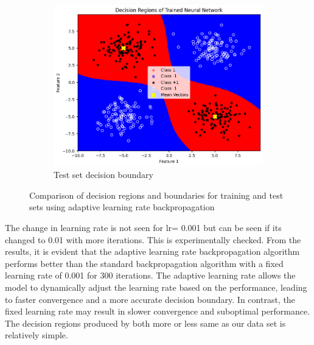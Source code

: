 \documentclass[a4paper,12pt]{article}
\begin{document}
\begin{figure}[H]
    \begin{subfigure}{0.45\textwidth}
        \centering
        \includegraphics[width=\textwidth]{2.4_Test.png}
        \caption{Test set decision boundary}
    \end{subfigure}

        \caption{Comparison of decision regions and boundaries for training and test sets using adaptive learning rate backpropagation}
\end{figure}
The change in learning rate is not seen for lr= 0.001 but can be seen if its changed to 0.01 with more iterations. This is experimentally checked.
From the results, it is evident that the adaptive learning rate backpropagation algorithm performs better than the standard backpropagation algorithm with a fixed learning rate of 0.001 for 300 iterations. The adaptive learning rate allows the model to dynamically adjust the learning rate based on the performance, leading to faster convergence and a more accurate decision boundary. In contrast, the fixed learning rate may result in slower convergence and suboptimal performance. The decision regions produced by both more or less same as our data set is relatively simple.
\newpage
\end{document}
